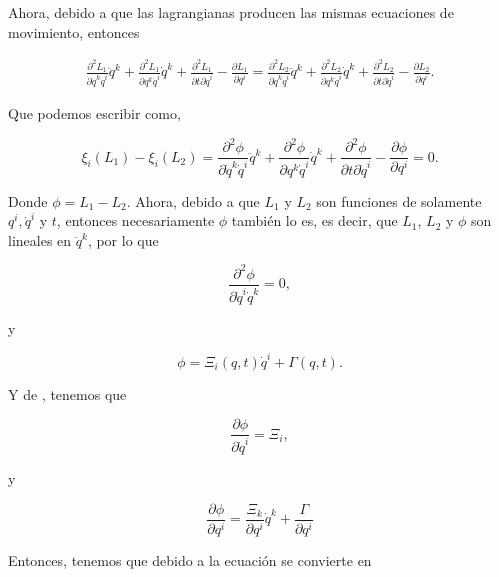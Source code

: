 \documentclass[a4paper,10pt]{article}
\numberwithin{equation}{section}
\begin{document}
Ahora, debido a que las lagrangianas producen las mismas ecuaciones de movimiento,
entonces 

\begin{align}
 \frac{\partial^2 L_1}{\partial \dot{q}^k\dot{q}^i} \ddot{q}^k + 
 \frac{\partial^2 L_1}{\partial q^k \dot{q}^i} \dot{q}^k+ \frac{\partial^2 L_1}{\partial t \partial \dot{q}^i}
 - \frac{\partial L_1}{\partial q^i} = \frac{\partial^2 L_2}{\partial \dot{q}^k\dot{q}^i} \ddot{q}^k + 
 \frac{\partial^2 L_2}{\partial q^k \dot{q}^i} \dot{q}^k+ \frac{\partial^2 L_2}{\partial t \partial \dot{q}^i}
 - \frac{\partial L_2}{\partial q^i}.
\end{align}

Que podemos escribir como,

\begin{equation}
 \xi_i (L_1) - \xi_i (L_2) = \frac{\partial^2 \phi}{\partial \dot{q}^k\dot{q}^i} \ddot{q}^k
 + \frac{\partial^2 \phi}{\partial q^k \dot{q}^i} \dot{q}^k + \frac{\partial^2 \phi}{\partial t \partial \dot{q}^i}  
 - \frac{\partial \phi}{\partial q^i} = 0.
 \label{eq:4cero}
 \end{equation}

Donde $\phi = L_1 - L_2$. Ahora, debido a que $L_1$ y $L_2$ son funciones de solamente 
$q^i,\dot{q}^i$ y $t$, entonces necesariamente $\phi$ también lo es, es decir, que 
$L_1$, $L_2$ y $\phi$ son lineales en $\ddot{q}^k$, por lo que

\begin{equation}
 \frac{\partial^2 \phi}{\partial \dot{q}^i\dot{q}^k} = 0,
 \label{eq:4phi0}
\end{equation}

y 

\begin{equation}
 \phi = \Xi_i (q,t) \dot{q}^i + \Gamma(q,t).
 \label{eq:4phi1}
\end{equation}

Y de , tenemos que 

\begin{equation}
 \frac{\partial \phi}{\partial \dot{q}^i} = \Xi_i,
 \label{eq:4xi1}
\end{equation}

y

\begin{equation}
 \frac{\partial \phi}{\partial q^i} = \frac{\Xi_k}{\partial q^i}\dot{q}^k + \frac{\Gamma}{\partial q^i}
\label{eq:4phipartial}
 \end{equation}


Entonces, tenemos que debido a  la ecuación  se convierte en
\end{document}
